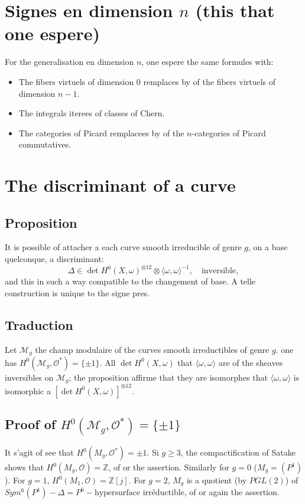 \documentclass[11pt,a4paper]{article}
\theoremstyle{plain}
\theoremstyle{definition}
\newcommand{\Z}{\mathbb{Z}}
\newcommand{\cO}{\mathcal{O}}
\begin{document}
\section{Signes en dimension $n$ (this that one espere)}

For the generalisation en dimension $n$, one espere the same formules with:
\begin{itemize}
\item The fibers virtuels of dimension 0 remplaces by of the fibers virtuels of dimension $n-1$.
\item The integrals iterees of classes of Chern.
\item The categories of Picard remplacees by of the $n$-categories of Picard commutatives.
\end{itemize}

\section{The discriminant of a curve}

\subsection{Proposition}
It is possible of attacher a each curve smooth irreducible of genre $g$, on a base quelconque, a discriminant:
\begin{equation}
\Delta \in \det H^0(X, \omega)^{\otimes 12} \otimes \langle \omega, \omega \rangle^{-1}, \quad \text{inversible},
\end{equation}
and this in such a way compatible to the changement of base. A telle construction is unique to the signe pres.

\subsection{Traduction}
Let $\mathcal{M}_g$ the champ modulaire of the curves smooth irreductibles of genre $g$. one has $H^0(\mathcal{M}_g, \cO^*) = \{\pm 1\}$. All $\det H^0(X, \omega)$ that $\langle \omega, \omega \rangle$ are of the sheaves inversibles on $\mathcal{M}_g$; the proposition affirme that they are isomorphes that $\langle \omega, \omega \rangle$ is isomorphic a $[\det H^0(X, \omega)]^{\otimes 12}$.

\subsection{Proof of $H^0(\mathcal{M}_g, \cO^*) = \{\pm 1\}$}
It s'agit of see that $H^0(M_g, \cO^*) = \pm 1$. Si $g \geq 3$, the compactification of Satake shows that $H^0(M_g, \cO) = \Z$, of or the assertion. Similarly for $g = 0$ ($M_g = (P^1)$). For $g = 1$, $H^0(M_1, \cO) = \Z[j]$. For $g = 2$, $M_g$ is a quotient (by $PGL(2)$) of $Sym^6(P^1) - \Delta = P^6 - \text{hypersurface irr\'eductible}$, of or again the assertion.
\end{document}

